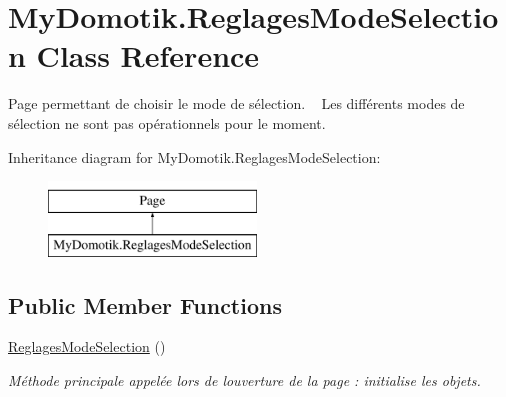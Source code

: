\hypertarget{class_my_domotik_1_1_reglages_mode_selection}{}\section{My\+Domotik.\+Reglages\+Mode\+Selection Class Reference}
\label{class_my_domotik_1_1_reglages_mode_selection}


Page permettant de choisir le mode de sélection. ~\newline
Les différents modes de sélection ne sont pas opérationnels pour le moment.  


Inheritance diagram for My\+Domotik.\+Reglages\+Mode\+Selection\+:\begin{figure}[H]
\begin{center}
\leavevmode
\includegraphics[height=2.000000cm]{class_my_domotik_1_1_reglages_mode_selection}
\end{center}
\end{figure}
\subsection*{Public Member Functions}
\begin{DoxyCompactItemize}
\item 
\hyperlink{class_my_domotik_1_1_reglages_mode_selection_a9decfefcf91552c06a3d0458056231df}{Reglages\+Mode\+Selection} ()
\begin{DoxyCompactList}\small\item\em Méthode principale appelée lors de l\textquotesingle{}ouverture de la page \+: initialise les objets. \end{DoxyCompactList}\end{DoxyCompactItemize}
